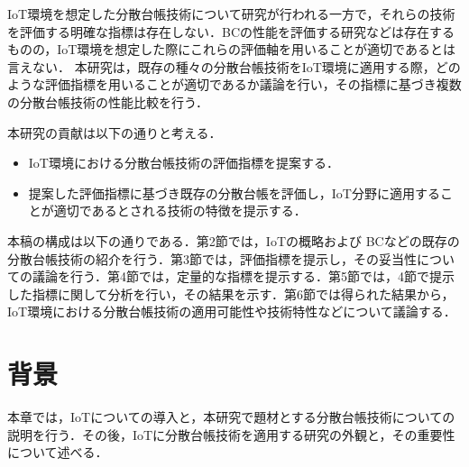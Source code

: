 \documentclass[japanese, macos]{KU2}
\begin{document}
IoT環境を想定した分散台帳技術について研究が行われる一方で，それらの技術を評価する明確な指標は存在しない．BCの性能を評価する研究\cite{croman2016scaling}などは存在するものの，IoT環境を想定した際にこれらの評価軸を用いることが適切であるとは言えない．
本研究は，既存の種々の分散台帳技術をIoT環境に適用する際，どのような評価指標を用いることが適切であるか議論を行い，その指標に基づき複数の分散台帳技術の性能比較を行う．

本研究の貢献は以下の通りと考える．
\begin{itemize}
\item IoT環境における分散台帳技術の評価指標を提案する．
\item 提案した評価指標に基づき既存の分散台帳を評価し，IoT分野に適用することが適切であるとされる技術の特徴を提示する．
\end{itemize}

本稿の構成は以下の通りである．第2節では，IoTの概略および BCなどの既存の分散台帳技術の紹介を行う．第3節では，評価指標を提示し，その妥当性についての議論を行う．第4節では，定量的な指標を提示する．第5節では，4節で提示した指標に関して分析を行い，その結果を示す．第6節では得られた結果から，IoT環境における分散台帳技術の適用可能性や技術特性などについて議論する．

\chapter{背景}
本章では，IoTについての導入と，本研究で題材とする分散台帳技術についての説明を行う．その後，IoTに分散台帳技術を適用する研究の外観と，その重要性について述べる．
\end{document}
